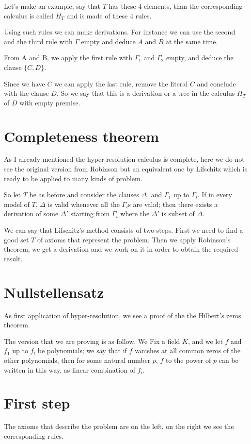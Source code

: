 \documentclass[12pt,a4paper,oneside]{article}
\begin{document}
Let's make an example, say that $T$ has these 4 elements, than the corresponding calculus is called $H_T$ and is made of these 4 rules.

Using such rules we can make derivations. For instance we can use the second and the third rule with $\Gamma$ empty and deduce $A$ and $B$ at the same time.

From A and B, we apply the first rule with $\Gamma_1$ and $\Gamma_2$ empty, and deduce the clause $\{C,D\}$.

Since we have $C$ we can apply the last rule, remove the literal $C$ and conclude with the clause $D$.
So we say that this is a derivation or a tree in the calculus $H_T$ of $D$ with empty premise.

\section{Completeness theorem}
As I already mentioned the hyper-resolution calculus is complete, here we do not see the original version from Robinson but an equivalent one by Lifschitz which is ready to be applied to many kinds of problem.

So let $T$ be as before and consider the clauses $\Delta$, and $\Gamma_1$ up to $\Gamma_l$. If in every model of $T$, $\Delta$ is valid whenever all the $\Gamma_i$s are valid; then there exists a derivation of some $\Delta'$ starting from  $\Gamma_i$ where the $\Delta'$ is subset of $\Delta$.

We can say that Lifschitz's method consists of two steps. First we  need to find a good set $T$ of axioms that represent the problem. Then we apply Robinson's theorem, we get a derivation and we work on it in order to obtain the required result.
 

\section{Nullstellensatz}
As first application of hyper-resolution, we see a proof of the the Hilbert's zeros theorem.
 
The version that we are proving is as follow. We Fix a field $K$, and we let 
$f$ and $f_1$ up to $f_l$ be polynomials; we say that if $f$ vanishes at all common zeros of the other polynomials, then for some natural number $p$, $f$ to the power of $p$ can be written in this way, as linear combination of $f_i$.

\section{First step}
The axioms that describe the problem are on the left, on the right we see the corresponding rules.
\end{document}
